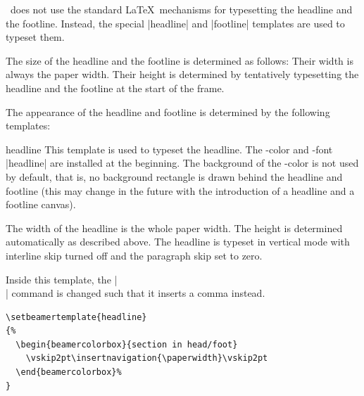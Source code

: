 \beamer\ does not use the standard \LaTeX\ mechanisms for typesetting the headline and the footline. Instead, the special |headline| and |footline| templates are used to typeset them.

The size of the headline and the footline is determined as follows: Their width is always the paper width. Their height is determined by tentatively typesetting the headline and the footline at the start of the frame.

The appearance of the headline and footline is determined by the following templates:

\begin{element}{headline}\yes\yes\yes
  This template is used to typeset the headline. The \beamer-color and -font |headline| are installed at the beginning. The background of the \beamer-color is not used by default, that is, no background rectangle is drawn behind the headline and footline (this may change in the future with the introduction of a headline and a footline canvas).

  The width of the headline is the whole paper width. The height is determined automatically as described above. The headline is typeset in vertical mode with interline skip turned off and the paragraph skip set to zero.

  Inside this template, the |\\| command is changed such that it inserts a comma instead.

  \example
\begin{verbatim}
\setbeamertemplate{headline}
{%
  \begin{beamercolorbox}{section in head/foot}
    \vskip2pt\insertnavigation{\paperwidth}\vskip2pt
  \end{beamercolorbox}%
}
\end{verbatim}


\end{element}
